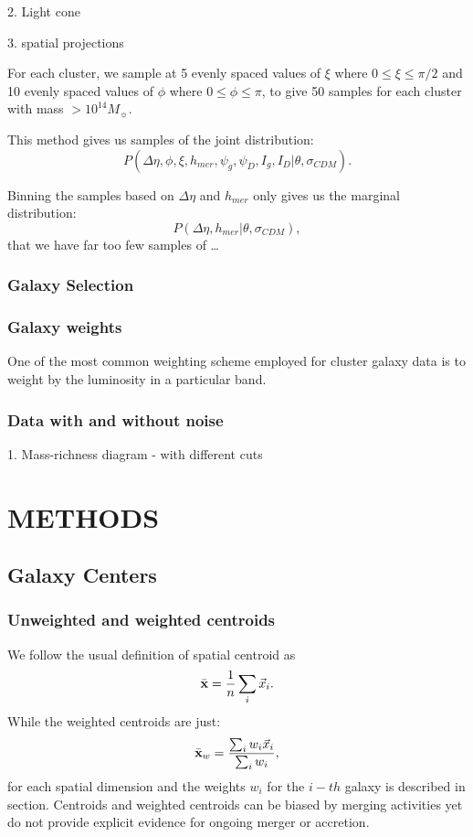 \documentclass[letterpaper,useAMS,usenatbib]{mn2e}
\begin{document}
2. Light cone 







3. spatial projections 

For each cluster, we sample at 5 evenly spaced values of $\xi$ where $0 \leq \xi \leq \pi / 2$ and 
10 evenly spaced values of $\phi$ where $0 \leq \phi \leq \pi$, to give 50
samples for each cluster with mass $> 10^{14} M_\sun$. 

This method gives us samples of the joint distribution: 
\begin{equation}
	P(\Delta \eta, \phi, \xi, h_{mer}, \psi_g, \psi_D, I_g, I_D | \theta,
	\sigma_{CDM}). 
\end{equation}


Binning the samples based on $\Delta \eta$ and $h_{mer}$ only gives us the
marginal distribution:
\begin{equation}
	P(\Delta \eta, h_{mer} | \theta, \sigma_{CDM}),
\end{equation}
that we have far too few samples of \dots




\subsubsection{Galaxy Selection}
\subsubsection{Galaxy weights}
One of the most common weighting scheme employed for cluster galaxy data is to weight
by the luminosity in a particular band.

\subsubsection{Data with and without noise}
1. Mass-richness diagram - with different cuts  
\section{METHODS} 

\subsection{Galaxy Centers}
\subsubsection{Unweighted and weighted centroids}
We follow the usual definition of spatial centroid as 
\begin{equation}
	\bar{\bf x} = \frac{1}{n} \sum_i \vec{x}_i. 
\end{equation}
While the weighted centroids are just: 
\begin{equation}
	\bar{\bf x}_w = \frac{\sum_i w_i \vec{x}_i}{\sum_i w_i},
\end{equation}
for each spatial dimension and the weights $w_i$ for the $i-th$ galaxy
is described in section.
Centroids and weighted centroids can be biased by merging activities yet do
not provide explicit evidence for ongoing merger or accretion. 
\end{document}
